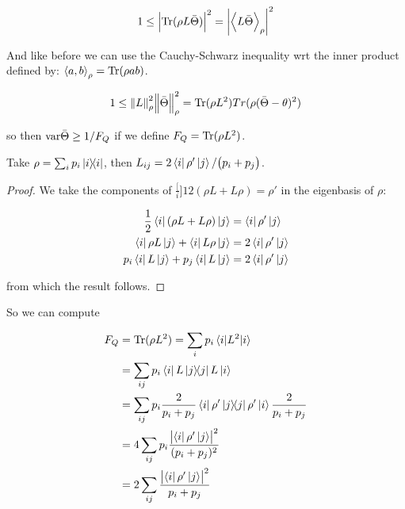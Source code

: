 \documentclass[main.tex]{subfiles}
\begin{document}
\begin{equation}
  1 \leq \abs{\operatorname*{Tr} (\rho L \bar{\Theta})}^{2} = \abs{\expval{L \bar\Theta}_{\rho} }^{2}
\end{equation}

And like before we can use the Cauchy-Schwarz inequality wrt the inner product defined by: \(\expval{a, b}_\rho = \operatorname*{Tr} (\rho ab) \).

\begin{equation}
  1 \leq \norm{L}^{2} _{\rho}  \norm{\bar{\Theta}}^{2} _{\rho}
  = \operatorname*{Tr} (\rho L^2 ) Tr(\rho (\bar\Theta - \theta)^2)
\end{equation}

so then \( \text{var}{\bar\Theta} \geq 1/F_Q \) if we define \(F_Q = \operatorname*{Tr} (\rho L^2)\).

\begin{claim}
Take \( \rho = \sum_i p_i \ketbra{i} \), then \( L _{ij} = 2\bra{i}\rho' \ket{j}/\qty(p_i + p_j) \).
\end{claim}

\begin{bluebox}
  \begin{proof}
      We take the components of \(\frac[i]{1}{2} (\rho L + L \rho) = \rho' \) in the eigenbasis of \(\rho\):

      \begin{subequations}
      \begin{align}
        \frac{1}{2} \bra{i} \qty(\rho L + L \rho) \ket{j}  &= \bra{i} \rho' \ket{j}  \\
         \bra{i} \rho L \ket{j} + \bra{i} L \rho \ket{j} &= 2  \bra{i} \rho' \ket{j} \\
         p_i \bra{i} L \ket{j} + p_j \bra{i} L \ket{j} &= 2  \bra{i} \rho' \ket{j}
      \end{align}
      \end{subequations}

      from which the result follows.
  \end{proof}
\end{bluebox}

So we can compute

\begin{subequations}
\begin{align}
    F_Q &= \Tr(\rho L^2) = \sum_i p_i \ev{L^2}{i}  \\
    &= \sum _{ij} p_i \bra{i} L \ketbra{j} L \ket{i}  \\
    &= \sum _{ij} p_i \frac{2}{p_i + p_j} \bra{i} \rho' \ketbra{j} \rho' \ket{i} \frac{2}{p_i + p_j}  \\
    &= 4 \sum _{ij} p_i\frac{\abs{\bra{i} \rho' \ket{j}}^2 }{(p_i + p_j)^2}  \\
    &= 2 \sum_{ij} \frac{\abs{\bra{i} \rho' \ket{j}}^2 }{p_i + p_j}  \label{eq:fisher-explicit}
\end{align}
\end{subequations}
\end{document}
